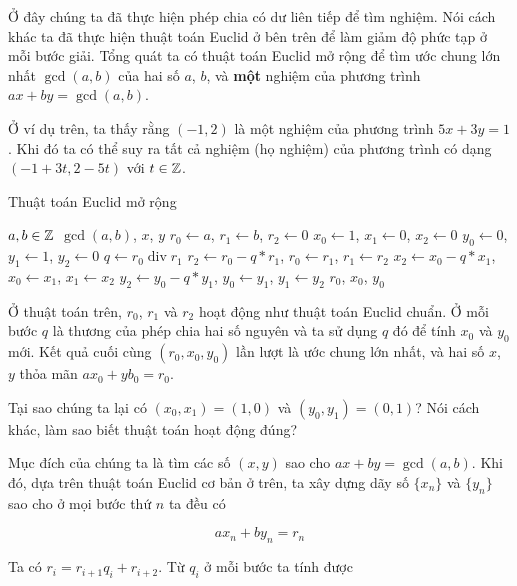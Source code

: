 Ở đây chúng ta đã thực hiện phép chia có dư liên tiếp để tìm
nghiệm. Nói cách khác ta đã thực hiện thuật toán Euclid ở bên trên
để làm giảm độ phức tạp ở mỗi bước giải. Tổng quát ta có thuật toán 
Euclid mở rộng để tìm ước chung lớn nhất $\gcd(a, b)$ của hai 
số $a$, $b$, và \textbf{một} nghiệm của phương trình $ax + by = \gcd(a, b)$.

Ở ví dụ trên, ta thấy rằng $(-1, 2)$ là một nghiệm của phương
trình $5x + 3y = 1$. Khi đó ta có thể suy ra tất cả nghiệm
(họ nghiệm) của phương trình có dạng $(-1+3t, 2-5t)$ với $t \in \mathbb{Z}$.

\begin{algorithm}
    \caption{Thuật toán Euclid mở rộng}
    \begin{algorithmic}
        \Require $a, b \in \mathbb{Z}$
        \Ensure $\gcd(a, b)$, $x$, $y$ 
        \State $r_0 \gets a$, $r_1 \gets b$, $r_2 \gets 0$
        \State $x_0 \gets 1$, $x_1 \gets 0$, $x_2 \gets 0$
        \State $y_0 \gets 0$, $y_1 \gets 1$, $y_2 \gets 0$
            \State $q \gets r_0 \;\text{div}\; r_1$
            \State $r_2 \gets r_0 - q * r_1$, $r_0 \gets r_1$, $r_1 \gets r_2$
            \State $x_2 \gets x_0 - q * x_1$, $x_0 \gets x_1$, $x_1 \gets x_2$
            \State $y_2 \gets y_0 - q * y_1$, $y_0 \gets y_1$, $y_1 \gets y_2$
        \EndWhile
        \State \Return $r_0$, $x_0$, $y_0$
    \end{algorithmic}
\end{algorithm}

Ở thuật toán trên, $r_0$, $r_1$ và $r_2$ hoạt động
như thuật toán Euclid chuẩn. Ở mỗi bước $q$ là thương của phép
chia hai số nguyên và ta sử dụng $q$ đó để tính $x_0$ và $y_0$
mới. Kết quả cuối cùng $(r_0, x_0, y_0)$ lần lượt là
ước chung lớn nhất, và hai số $x$, $y$ thỏa mãn $a x_0 + y b_0 = r_0$.

Tại sao chúng ta lại có $(x_0, x_1) = (1, 0)$ và
$(y_0, y_1) = (0, 1)$? Nói cách khác, làm sao biết thuật toán 
hoạt động đúng?

Mục đích của chúng ta là tìm các số $(x, y)$ sao cho $ax + by = \gcd(a, b)$.
Khi đó, dựa trên thuật toán Euclid cơ bản ở trên, ta xây dựng
dãy số $\{x_n\}$ và $\{y_n\}$ sao cho ở mọi bước thứ $n$ ta đều có

\begin{equation}\label{euclid:1}
    a x_n + b y_n = r_n
\end{equation}

Ta có $r_i = r_{i+1} q_i + r_{i+2}$. Từ $q_i$ ở mỗi bước ta tính
được

